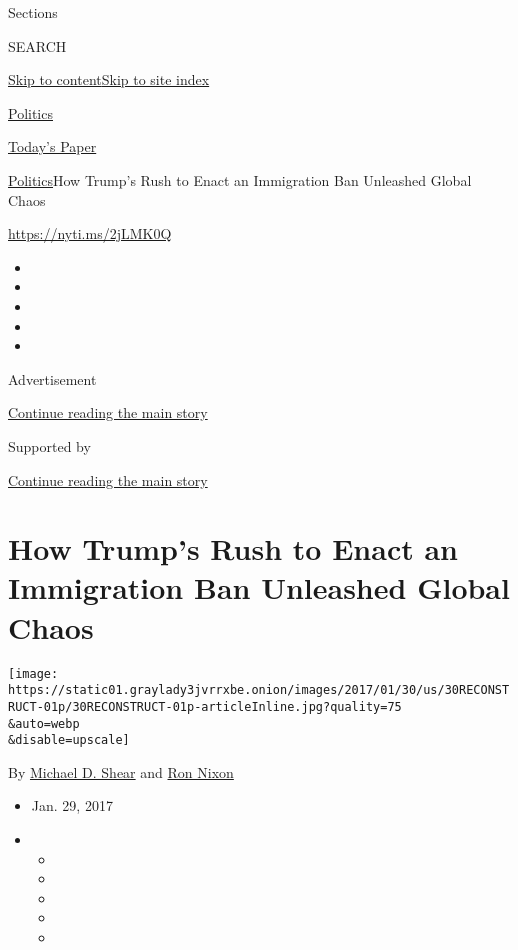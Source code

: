 Sections

SEARCH

\protect\hyperlink{site-content}{Skip to
content}\protect\hyperlink{site-index}{Skip to site index}

\href{https://www.nytimes3xbfgragh.onion/section/politics}{Politics}

\href{https://myaccount.nytimes3xbfgragh.onion/auth/login?response_type=cookie\&client_id=vi}{}

\href{https://www.nytimes3xbfgragh.onion/section/todayspaper}{Today's
Paper}

\href{/section/politics}{Politics}\textbar{}How Trump's Rush to Enact an
Immigration Ban Unleashed Global Chaos

\url{https://nyti.ms/2jLMK0Q}

\begin{itemize}
\item
\item
\item
\item
\item
\end{itemize}

Advertisement

\protect\hyperlink{after-top}{Continue reading the main story}

Supported by

\protect\hyperlink{after-sponsor}{Continue reading the main story}

\hypertarget{how-trumps-rush-to-enact-an-immigration-ban-unleashed-global-chaos}{%
\section{How Trump's Rush to Enact an Immigration Ban Unleashed Global
Chaos}\label{how-trumps-rush-to-enact-an-immigration-ban-unleashed-global-chaos}}

\texttt{[image: https://static01.graylady3jvrrxbe.onion/images/2017/01/30/us/30RECONSTRUCT-01p/30RECONSTRUCT-01p-articleInline.jpg?quality=75\\\&auto=webp\\\&disable=upscale]}

By \href{http://www.nytimes3xbfgragh.onion/by/michael-d-shear}{Michael
D. Shear} and \href{http://www.nytimes3xbfgragh.onion/by/ron-nixon}{Ron
Nixon}

\begin{itemize}
\item
  Jan. 29, 2017
\item
  \begin{itemize}
  \item
  \item
  \item
  \item
  \item
  \end{itemize}
\end{itemize}

